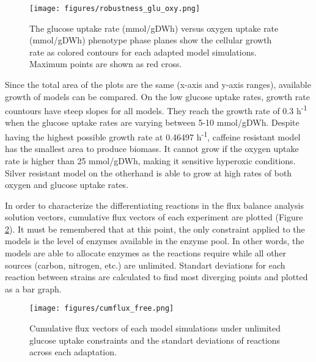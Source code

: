 \begin{figure}[H]
  \begin{center}
  \texttt{[image: figures/robustness\_glu\_oxy.png]}
  \caption[The glucose uptake rate (mmol/gDWh) versus oxygen uptake rate (mmol/gDWh) phenotype phase planes show the cellular growth rate as colored contours for each adapted model simulations]{The glucose uptake rate (mmol/gDWh) versus oxygen uptake rate (mmol/gDWh) phenotype phase planes show the cellular growth rate as colored contours for each adapted model simulations. Maximum points are shown as red cross.}
  \label{fig:robustness_glu_oxy}
  \end{center}
  \end{figure}
\vspace{-1.0cm}

 Since the total area of the plots are the same (x-axis and y-axis ranges), available growth of models can be compared. On the low glucose uptake rates, growth rate countours have steep slopes for all models. They reach the growth rate of 0.3 h\textsuperscript{-1} when the glucose uptake rates are varying between 5-10 mmol/gDWh. Despite having the highest possible growth rate at 0.46497 h\textsuperscript{-1}, caffeine resistant model has the smallest area to produce biomass. It cannot grow if the oxygen uptake rate is higher than 25 mmol/gDWh, making it sensitive hyperoxic conditions. Silver resistant model on the otherhand is able to grow at high rates of both oxygen and glucose uptake rates.

In order to characterize the differentiating reactions in the flux balance analysis solution vectors, cumulative flux vectors of each experiment are plotted (Figure \ref{fig:cumflux_free}). It must be remembered that at this point, the only constraint applied to the models is the level of enzymes available in the enzyme pool. In other words, the models are able to allocate enzymes as the reactions require while all other sources (carbon, nitrogen, etc.) are unlimited. Standart deviations for each reaction between strains are calculated to find most diverging points and plotted as a bar graph.

\begin{figure}[H]
  \begin{center}
  \texttt{[image: figures/cumflux\_free.png]}
  \caption[Cumulative flux vectors of each model simulations under unlimited glucose uptake constraints and the standart deviations of reactions across each adaptation]{Cumulative flux vectors of each model simulations under unlimited glucose uptake constraints and the standart deviations of reactions across each adaptation.}
  \label{fig:cumflux_free}
  \end{center}
\end{figure}

